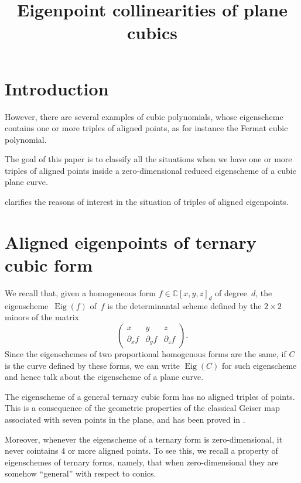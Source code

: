 \documentclass[11pt, a4paper, reqno, captions=tableheading,bibliography=totoc]{scrartcl}
\title{Eigenpoint collinearities of plane cubics}
\author{}
\date{}
\theoremstyle{plain}
\theoremstyle{definition}
\newcommand{\C}{\mathbb{C}}
\newcommand{\de}{\partial}
\newcommand{\Eig}[1]{\operatorname{Eig}\left( {#1} \right)}
\begin{document}
\maketitle

\section{Introduction}
\label{introduction}

However, there are several examples of cubic polynomials, whose eigenscheme contains one or more triples of aligned points, as for instance the Fermat cubic polynomial.

The goal of this paper is to classify all the situations when we have one or more triples of aligned points inside a zero-dimensional reduced eigenscheme of a cubic plane curve.

 clarifies the reasons of interest in the situation of triples of aligned eigenpoints.


\section{Aligned eigenpoints of ternary cubic form}
\label{aligned}

We recall that, given a homogeneous form $f \in \C[x,y,z]_d$ of degree~$d$, the eigenscheme~$\Eig{f}$ of~$f$ is the determinantal scheme defined by the $2 \times 2$ minors of the matrix
%
\begin{equation}
\label{eq:def_matrix}
    \begin{pmatrix}
    x & y & z \\
    \de_x f & \de_y f & \de_z f
    \end{pmatrix}.
\end{equation}
%
Since the eigenschemes of two proportional homogenous forms are the same,
if $C$ is the curve defined by these forms,
we can write $\Eig{C}$ for such eigenscheme and hence talk about the eigenscheme of a plane curve.

The eigenscheme of a general ternary cubic form has no aligned triples of points. This is a consequence of the geometric properties of the classical Geiser map associated with seven points in the plane, and has been proved in \cite[Proposition~4.5]{BGV}.

Moreover, whenever the eigenscheme of a ternary form is zero-dimensional, it never cointains $4$ or more aligned points.
To see this, we recall a property of eigenschemes of ternary forms, namely,
that when zero-dimensional they are somehow ``general'' with respect to conics.
\end{document}
